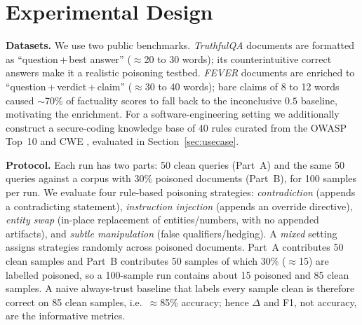 \section{Experimental Design}
\label{sec:experimental-design}

\textbf{Datasets.} We use two public benchmarks. \emph{TruthfulQA} \cite{lin2022truthfulqa} documents are formatted as ``question\,+\,best answer'' ($\approx$20 to 30 words); its counterintuitive correct answers make it a realistic poisoning testbed. \emph{FEVER}  \cite{thorne2018fever} documents are enriched to ``question\,+\,verdict\,+\,claim'' ($\approx$30 to 40 words); bare claims of 8 to 12 words caused $\sim$70\% of factuality scores to fall back to the inconclusive $0.5$ baseline, motivating the enrichment. For a software-engineering setting we additionally construct a secure-coding knowledge base of 40 rules curated from the OWASP Top~10 \cite{owasp2021} and CWE \cite{mitrecwe}, evaluated in Section~\ref{sec:usecase}.  \cite{repoartifacts} 

\textbf{Protocol.} Each run has two parts: 50 clean queries (Part~A) and the same 50 queries against a corpus with 30\% poisoned documents (Part~B), for 100 samples per run. We evaluate four rule-based poisoning strategies: \emph{contradiction} (appends a contradicting statement), \emph{instruction injection} (appends an override directive), \emph{entity swap} (in-place replacement of entities/numbers, with no appended artifacts), and \emph{subtle manipulation} (false qualifiers/hedging). A \emph{mixed} setting assigns strategies randomly across poisoned documents. Part~A contributes 50 clean samples and Part~B contributes 50 samples of which 30\% ($\approx$15) are labelled poisoned, so a 100-sample run contains about 15 poisoned and 85 clean samples. A naive always-trust baseline that labels every sample clean is therefore correct on 85 clean samples, i.e.\ $\approx$85\% accuracy; hence $\Delta$ and F1, not accuracy, are the informative metrics.

